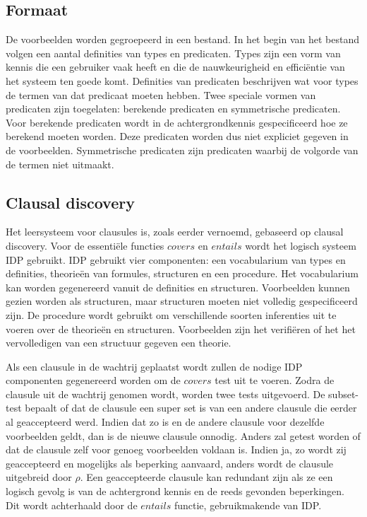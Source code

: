 \subsection{Formaat}
De voorbeelden worden gegroepeerd in een bestand.
In het begin van het bestand volgen een aantal definities van types en predicaten.
Types zijn een vorm van kennis die een gebruiker vaak heeft en die de nauwkeurigheid en effici\"entie van het systeem ten goede komt.
Definities van predicaten beschrijven wat voor types de termen van dat predicaat moeten hebben.
Twee speciale vormen van predicaten zijn toegelaten: berekende predicaten en symmetrische predicaten.
Voor berekende predicaten wordt in de achtergrondkennis gespecificeerd hoe ze berekend moeten worden.
Deze predicaten worden dus niet expliciet gegeven in de voorbeelden.
Symmetrische predicaten zijn predicaten waarbij de volgorde van de termen niet uitmaakt.

\subsection{Clausal discovery}
Het leersysteem voor clausules is, zoals eerder vernoemd, gebaseerd op clausal discovery.
Voor de essenti\"ele functies $\mathit{covers}$ en $\mathit{entails}$ wordt het logisch systeem IDP gebruikt.
IDP gebruikt vier componenten: een vocabularium van types en definities, theorie\"en van formules, structuren en een procedure.
Het vocabularium kan worden gegenereerd vanuit de definities en structuren.
Voorbeelden kunnen gezien worden als structuren, maar structuren moeten niet volledig gespecificeerd zijn.
De procedure wordt gebruikt om verschillende soorten inferenties uit te voeren over de theorie\"en en structuren.
Voorbeelden zijn het verifi\"eren of het het vervolledigen van een structuur gegeven een theorie.

Als een clausule in de wachtrij geplaatst wordt zullen de nodige IDP componenten gegenereerd worden om de $\mathit{covers}$ test uit te voeren.
Zodra de clausule uit de wachtrij genomen wordt, worden twee tests uitgevoerd.
De subset-test bepaalt of dat de clausule een super set is van een andere clausule die eerder al geaccepteerd werd.
Indien dat zo is en de andere clausule voor dezelfde voorbeelden geldt, dan is de nieuwe clausule onnodig.
Anders zal getest worden of dat de clausule zelf voor genoeg voorbeelden voldaan is.
Indien ja, zo wordt zij geaccepteerd en mogelijks als beperking aanvaard, anders wordt de clausule uitgebreid door $\rho$.
Een geaccepteerde clausule kan redundant zijn als ze een logisch gevolg is van de achtergrond kennis en de reeds gevonden beperkingen.
Dit wordt achterhaald door de $\mathit{entails}$ functie, gebruikmakende van IDP.

